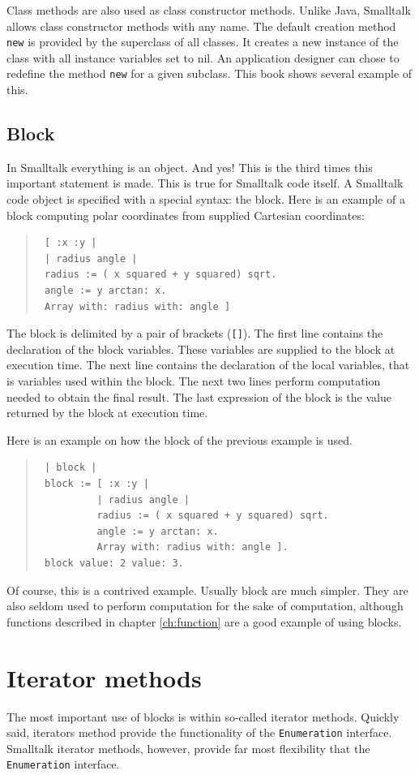 \documentclass[twoside]{book}
\begin{document}
Class methods are also used as class constructor methods. Unlike
Java, Smalltalk allows class constructor methods with any name.
The default creation method {\tt new} is provided by the
superclass of all classes. It creates a new instance of the class
with all instance variables set to nil. An application designer
can chose to redefine the method {\tt new} for a given subclass.
This book shows several example of this.

\subsection{Block}
In Smalltalk everything is an object. And yes! This is the third
times this important statement is made. This is true for Smalltalk
code itself. A Smalltalk code object is specified with a special
syntax: the block. Here is an example of a block
computing polar coordinates from supplied Cartesian coordinates:
\begin{quote}
\begin{verbatim}
 [ :x :y |
 | radius angle |
 radius := ( x squared + y squared) sqrt.
 angle := y arctan: x.
 Array with: radius with: angle ]
\end{verbatim}
\end{quote}
The block  is delimited by a pair of brackets ({\tt []}).
The first line contains the declaration of the block variables.
These variables are supplied to the block  at execution
time. The next line contains the declaration of the local
variables, that is variables used within the block. The next two
lines perform computation needed to obtain the final result. The
last expression of the block  is the value returned by the
block  at execution time.

Here is an example on how the block of the previous example is
used.
\begin{quote}
\begin{verbatim}
 | block |
 block := [ :x :y |
          | radius angle |
          radius := ( x squared + y squared) sqrt.
          angle := y arctan: x.
          Array with: radius with: angle ].
 block value: 2 value: 3.
\end{verbatim}
\end{quote}
Of course, this is a contrived example. Usually block  are
much simpler. They are also seldom used to perform computation for
the sake of computation, although functions described in chapter
\ref{ch:function} are a good example of using blocks.

\section{Iterator methods}
\label{sec:iterator} The most important use of blocks is
within so-called iterator methods. Quickly said, iterators method
provide the functionality of the {\tt Enumeration} interface.
Smalltalk iterator methods, however, provide far most flexibility
that the {\tt Enumeration} interface.
\end{document}
